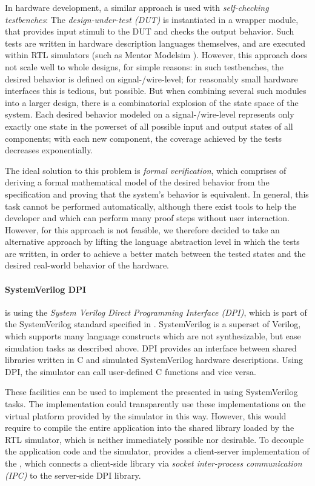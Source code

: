 \medskip
In hardware development, a similar approach is used with \emph{self-checking testbenches}:
The \emph{design-under-test (DUT)} is instantiated in a wrapper module, that provides input stimuli to the DUT and checks the output behavior.
Such tests are written in hardware description languages themselves, and are executed within RTL simulators (such as Mentor Modelsim \cite{modelsim}).
However, this approach does not scale well to whole designs, for simple reasons:
in such testbenches, the desired behavior is defined on signal-/wire-level; for reasonably small hardware interfaces this is tedious, but possible.
But when combining several such modules into a larger design, there is a combinatorial explosion of the state space of the system.
Each desired behavior modeled on a signal-/wire-level represents only exactly one state in the powerset of all possible input and output states of all components; with each new component, the coverage achieved by the tests decreases exponentially.

\medskip
The ideal solution to this problem is \emph{formal verification}, which comprises of deriving a formal mathematical model of the desired behavior from the specification and proving that the system's behavior is equivalent.
In general, this task cannot be performed automatically, although there exist tools to help the developer and which can perform many proof steps without user interaction.
However, for \tapasco{} this approach is not feasible, we therefore decided to take an alternative approach by lifting the language abstraction level in which the tests are written, in order to achieve a better match between the tested states and the desired real-world behavior of the hardware.

\medskip
\paragraph{SystemVerilog DPI}
\tapasco{} is using the \emph{System Verilog Direct Programming Interface (DPI)}, which is part of the SystemVerilog standard specified in \cite{sv-spec}.
SystemVerilog is a superset of Verilog, which supports many language constructs which are not synthesizable, but ease simulation tasks as described above.
DPI provides an interface between shared libraries written in C and simulated SystemVerilog hardware descriptions.
Using DPI, the simulator can call user-defined C functions and vice versa.

\medskip
These facilities can be used to implement the  presented in  using SystemVerilog tasks.
The  implementation could transparently use these implementations on the virtual platform provided by the simulator in this way.
However, this would require to compile the entire application into the shared library loaded by the RTL simulator, which is neither immediately possible nor desirable.
To decouple the application code and the simulator, \tapasco{} provides a client-server implementation of the , which connects a client-side library via \emph{socket inter-process communication (IPC)} to the server-side DPI library.


